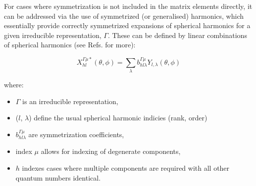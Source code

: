 \documentclass[10pt]{article}
\begin{document}


For cases where symmetrization is not included in the matrix elements directly, it can be addressed via the use of symmetrized (or generalised) harmonics, which essentially provide correctly symmetrized expansions of spherical harmonics for a given irreducible representation, $\Gamma$. These can be defined by linear combinations of spherical harmonics (see Refs.\cite{Altmann1963a,Altmann1965,Chandra1987} for more):

\begin{equation}
X_{hl}^{\Gamma\mu*}(\theta,\phi)=\sum_{\lambda}b_{hl\lambda}^{\Gamma\mu}Y_{l,\lambda}(\theta,\phi)\label{eq:symm-harmonics}
\end{equation}


where: 

\begin{itemize}
\item $\Gamma$ is an irreducible representation, 
\item ($l$, $\lambda$) define the usual spherical harmonic indicies (rank, order)
\item $b_{hl\lambda}^{\Gamma\mu}$ are symmetrization coefficients, 
\item index $\mu$ allows for indexing of degenerate components,
\item $h$ indexes cases where multiple components are required with all other quantum numbers identical. 
\end{itemize}
    
\end{document}
